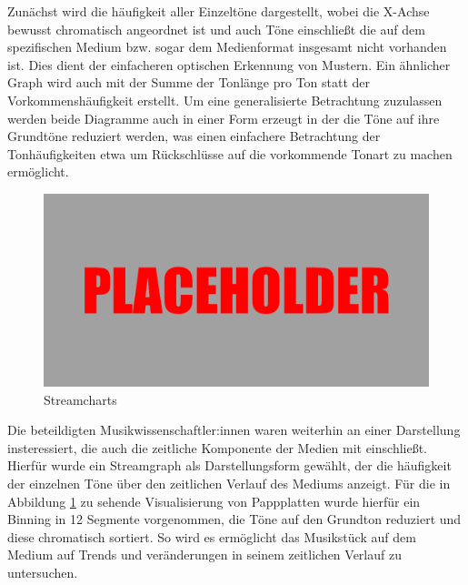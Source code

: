 Zunächst wird die häufigkeit aller Einzeltöne dargestellt, wobei die X-Achse bewusst chromatisch angeordnet ist und auch Töne einschließt die auf dem spezifischen Medium bzw. sogar dem Medienformat insgesamt nicht vorhanden ist.
Dies dient der einfacheren optischen Erkennung von Mustern.
Ein ähnlicher Graph wird auch mit der Summe der Tonlänge pro Ton statt der Vorkommenshäufigkeit erstellt.
Um eine generalisierte Betrachtung zuzulassen werden beide Diagramme auch in einer Form erzeugt in der die Töne auf ihre Grundtöne reduziert werden, was einen einfachere Betrachtung der Tonhäufigkeiten etwa um Rückschlüsse auf die vorkommende Tonart zu machen ermöglicht.

\begin{figure}[t]
    \centering
    \includegraphics[width=\textwidth]{graphics/placeholder.png}
    \caption{Streamcharts}
    \label{streamcharts}
\end{figure}

Die beteildigten Musikwissenschaftler:innen waren weiterhin an einer Darstellung insteressiert, die auch die zeitliche Komponente der Medien mit einschließt.
Hierfür wurde ein Streamgraph als Darstellungsform gewählt, der die häufigkeit der einzelnen Töne über den zeitlichen Verlauf des Mediums anzeigt.
Für die in Abbildung \ref{streamcharts} zu sehende Visualisierung von Pappplatten wurde hierfür ein Binning in 12 Segmente vorgenommen, die Töne auf den Grundton reduziert und diese chromatisch sortiert.
So wird es ermöglicht das Musikstück auf dem Medium auf Trends und veränderungen in seinem zeitlichen Verlauf zu untersuchen.

